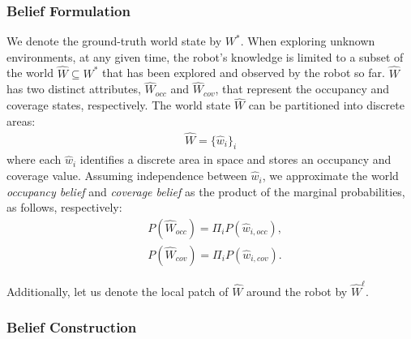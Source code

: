 \documentclass[letterpaper]{article} %
\begin{document}
\subsubsection{Belief Formulation} \hfill

\noindent
We denote the ground-truth world state by $W^*$. When exploring unknown environments, at any given time, the robot's knowledge is limited to a subset of the  world $\hat{W}\!\!\subseteq\! W^*$ that has been explored and observed by the robot so far.
$\hat{W}$ has two distinct attributes, $\hat{W}_{occ}$ and $\hat{W}_{cov}$, that represent the occupancy and coverage states, respectively. The world state $\hat{W}$ can be partitioned into discrete areas: 
\begin{align}
  \hat{W} = \{\hat{w}_i\}_i
\end{align}
where each $\hat{w}_i$ identifies a discrete area in space and stores an occupancy and coverage value. 
Assuming independence between $\hat{w}_i$, we approximate the world \textit{occupancy belief} and \textit{coverage belief} as the product of the marginal probabilities, as follows, respectively:
\begin{align}
  &P(\hat{W}_{occ}) = \Pi_i P(\hat{w}_{i,occ}), \\
  &P(\hat{W}_{cov}) = \Pi_i P(\hat{w}_{i,cov}). 
  \label{eq:coverage_belief}
\end{align}

Additionally, let us denote the local patch of $\hat{W}$ around the robot by $\hat{W}^\ell$.
%
%

\subsubsection{Belief Construction} \hfill
\end{document}
